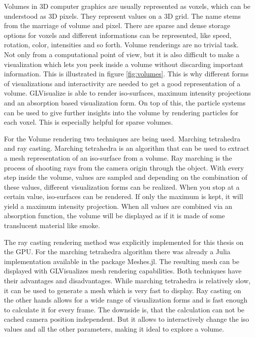 Volumes in 3D computer graphics are usually represented as voxels, which can be understood as 3D pixels. 
They represent values on a 3D grid. The name stems from the marriage of volume and pixel.
There are sparse and dense storage options for voxels and different informations can be represented, like speed, rotation, color, intensities and so forth.
Volume renderings are no trivial task. Not only from a computational point of view, but it is also difficult to make a visualization which lets you peek inside a volume without discarding important information. This is illustrated in figure \ref{fig:volumes}.
This is why different forms of visualizations and interactivity are needed to get a good representation of a volume.
GLVisualize is able to render iso-surfaces, maximum intensity projections and an absorption based visualization form. 
On top of this, the particle systems can be used to give further insights into the volume by rendering particles for each voxel. This is especially helpful for sparse volumes.

For the Volume rendering two techniques are being used. 
Marching tetrahedra and ray casting\cite{marques2009gpu}. 
Marching tetrahedra is an algorithm that can be used to extract a mesh representation of an iso-surface from a volume.
Ray marching is the process of shooting rays from the camera origin through the object.
With every step inside the volume, values are sampled and depending on the combination of these values, different visualization forms can be realized. When you stop at a certain value, iso-surfaces can be rendered. 
If only the maximum is kept, it will yield a maximum intensity projection. 
When all values are combined via an absorption function, the volume will be displayed as if it is made of some translucent material like smoke.

The ray casting rendering method was explicitly implemented for this thesis on the GPU. For the marching tetrahedra algorithm there was already a Julia implementation available in the package Meshes.jl\cite{Tedrahedra}. The resulting mesh can be displayed with GLVisualizes mesh rendering capabilities.
Both techniques have their advantages and disadvantages. 
While marching tetrahedra is relatively slow, it can be used to generate a mesh which is very fast to display. 
Ray casting on the other hands allows for a wide range of visualization forms and is fast enough to calculate it for every frame. The downside is, that the calculation can not be cached camera position independent. But it allows to interactively change the iso values and all the other parameters, making it ideal to explore a volume.
 

